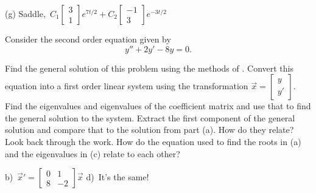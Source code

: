 {(g) Saddle,\ $C_1\left[\begin{smallmatrix} 3 \\ 1 \end{smallmatrix}\right]e^{7t/2} + C_2\left[\begin{smallmatrix} -1 \\ 3 \end{smallmatrix}\right]e^{-3t/2}$ \hfill{}\hfill\hfill
}%

\begin{exercise}
Consider the second order equation given by
\begin{equation*}
y'' + 2y' - 8y = 0.
\end{equation*}
\begin{tasks}
\task Find the general solution of this problem using the methods of .
\task Convert this equation into a first order linear system using the transformation $\vec{x} = \left[ \begin{smallmatrix} y \\ y' \end{smallmatrix} \right]$. 
\task Find the eigenvalues and eigenvalues of the coefficient matrix and use that to find the general solution to the system.
\task Extract the first component of the general solution and compare that to the solution from part (a). How do they relate?
\task Look back through the work. How do the equation used to find the roots in (a) and the eigenvalues in (c) relate to each other?
\end{tasks}
\end{exercise}
\comboSol{%
}
{%
b)~${\vec{x}}' = \left[\begin{smallmatrix} 0 & 1 \\8 & -2 \end{smallmatrix}\right]\vec{x}$ \quad d)~It's the same!
}

